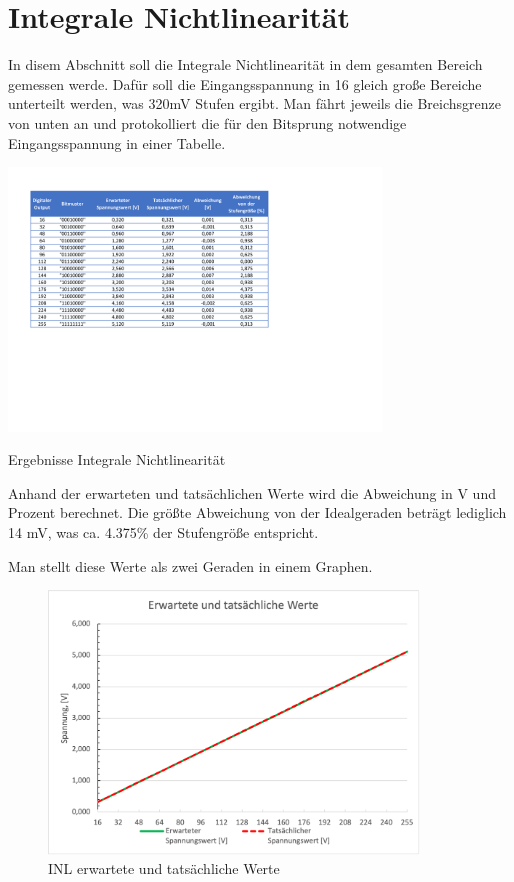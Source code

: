\section{Integrale Nichtlinearität}

In disem Abschnitt soll die Integrale Nichtlinearität in dem gesamten Bereich gemessen
werde. Dafür soll die Eingangsspannung in 16 gleich große Bereiche unterteilt werden, was 
320mV Stufen ergibt. Man fährt jeweils die Breichsgrenze von unten an und protokolliert 
die für den Bitsprung notwendige Eingangsspannung in einer Tabelle.


\begin{table}[H]
	\centering
	\includegraphics[height=7cm]{images/Versuch1d.pdf} 
	\caption{Ergebnisse Integrale Nichtlinearität}
	\label{fig: Ergebnisse Integrale Nichtlinearität}
\end{table}

Anhand der erwarteten und tatsächlichen Werte wird die Abweichung in V und Prozent
berechnet. Die größte Abweichung von der Idealgeraden beträgt lediglich 14 mV, 
was ca. 4.375\% der Stufengröße entspricht. \par

Man stellt diese Werte als zwei Geraden in einem Graphen.

\begin{figure}[H]
	\centering
	\includegraphics[height=7cm]{images/INL_gerade.png} 
	\caption{INL erwartete und tatsächliche Werte}
	\label{fig: INL erwartete und tatsächliche Werte}
\end{figure}


